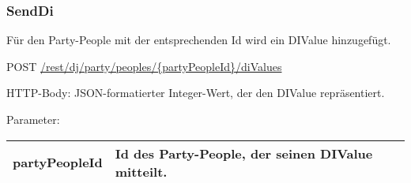 \subsubsection{SendDi}
\label{service:SendDi}
Für den Party-People mit der entsprechenden Id wird ein DIValue hinzugefügt.

POST
\url{/rest/dj/party/peoples/{partyPeopleId}/diValues}

HTTP-Body: JSON-formatierter Integer-Wert, der den DIValue repräsentiert.

Parameter:\\
\begin{tabularx}{\textwidth}{|l|X|}
\hline partyPeopleId & Id des Party-People, der seinen DIValue mitteilt. \\ 
\hline 
\end{tabularx}